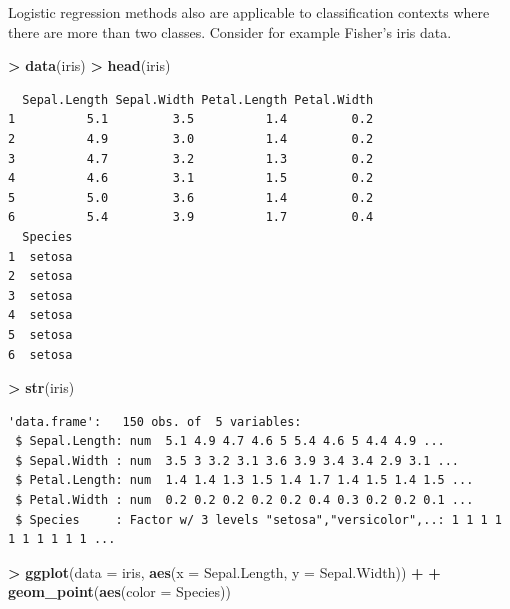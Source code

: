 \documentclass[]{krantz}
\makeatletter
\newenvironment{Shaded}{\begin{snugshade}}{\end{snugshade}}
\newcommand{\DataTypeTok}[1]{\textcolor[rgb]{0.27,0.27,0.27}{#1}}
\newcommand{\KeywordTok}[1]{\textcolor[rgb]{0.27,0.27,0.27}{\textbf{#1}}}
\newcommand{\NormalTok}[1]{#1}
\newcommand{\OperatorTok}[1]{\textcolor[rgb]{0.43,0.43,0.43}{\textbf{#1}}}
\newcommand{\StringTok}[1]{\textcolor[rgb]{0.5,0.5,0.5}{#1}}
\newenvironment{kframe}{%
\medskip{}
\setlength{\fboxsep}{.8em}
 \def\at@end@of@kframe{}%
 \ifinner\ifhmode%
  \def\at@end@of@kframe{\end{minipage}}%
  \begin{minipage}{\columnwidth}%
 \fi\fi%
 \def\FrameCommand##1{\hskip\@totalleftmargin \hskip-\fboxsep
 \colorbox{shadecolor}{##1}\hskip-\fboxsep
     \hskip-\linewidth \hskip-\@totalleftmargin \hskip\columnwidth}%
 \MakeFramed {\advance\hsize-\width
   \@totalleftmargin\z@ \linewidth\hsize
   \@setminipage}}%
 {\par\unskip\endMakeFramed%
 \at@end@of@kframe}
\renewenvironment{Shaded}{\begin{kframe}}{\end{kframe}}
\makeatother
\begin{document}
Logistic regression methods also are applicable to classification contexts where there are more than two classes. Consider for example Fisher's iris data.

\begin{Shaded}
\begin{Highlighting}[]
\OperatorTok{>}\StringTok{ }\KeywordTok{data}\NormalTok{(iris)}
\OperatorTok{>}\StringTok{ }\KeywordTok{head}\NormalTok{(iris)}
\end{Highlighting}
\end{Shaded}

\begin{verbatim}
  Sepal.Length Sepal.Width Petal.Length Petal.Width
1          5.1         3.5          1.4         0.2
2          4.9         3.0          1.4         0.2
3          4.7         3.2          1.3         0.2
4          4.6         3.1          1.5         0.2
5          5.0         3.6          1.4         0.2
6          5.4         3.9          1.7         0.4
  Species
1  setosa
2  setosa
3  setosa
4  setosa
5  setosa
6  setosa
\end{verbatim}

\begin{Shaded}
\begin{Highlighting}[]
\OperatorTok{>}\StringTok{ }\KeywordTok{str}\NormalTok{(iris)}
\end{Highlighting}
\end{Shaded}

\begin{verbatim}
'data.frame':   150 obs. of  5 variables:
 $ Sepal.Length: num  5.1 4.9 4.7 4.6 5 5.4 4.6 5 4.4 4.9 ...
 $ Sepal.Width : num  3.5 3 3.2 3.1 3.6 3.9 3.4 3.4 2.9 3.1 ...
 $ Petal.Length: num  1.4 1.4 1.3 1.5 1.4 1.7 1.4 1.5 1.4 1.5 ...
 $ Petal.Width : num  0.2 0.2 0.2 0.2 0.2 0.4 0.3 0.2 0.2 0.1 ...
 $ Species     : Factor w/ 3 levels "setosa","versicolor",..: 1 1 1 1 1 1 1 1 1 1 ...
\end{verbatim}

\begin{Shaded}
\begin{Highlighting}[]
\OperatorTok{>}\StringTok{ }\KeywordTok{ggplot}\NormalTok{(}\DataTypeTok{data =}\NormalTok{ iris, }\KeywordTok{aes}\NormalTok{(}\DataTypeTok{x =}\NormalTok{ Sepal.Length, }\DataTypeTok{y =}\NormalTok{ Sepal.Width)) }\OperatorTok{+}\StringTok{ }
\OperatorTok{+}\StringTok{   }\KeywordTok{geom_point}\NormalTok{(}\KeywordTok{aes}\NormalTok{(}\DataTypeTok{color =}\NormalTok{ Species))}
\end{Highlighting}
\end{Shaded}
\end{document}
